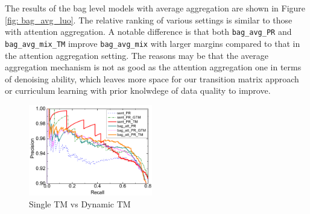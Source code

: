 The results of the bag level models with average aggregation are shown in Figure \ref{fig: bag_avg_luo}. The relative ranking of various settings is similar to those with attention aggregation.
A notable difference is that both \texttt{bag\_avg\_PR} and \texttt{bag\_avg\_mix\_TM} improve \texttt{bag\_avg\_mix} with larger margins compared to that in the attention aggregation setting. The reasons may be that the average aggregation mechanism is not as good as the attention aggregation one in terms of denoising ability, which leaves more space for our transition matrix approach or curriculum learning with prior knolwdege of data quality to improve.

\begin{figure}[t!]
\begin{center}
\includegraphics[width=0.48\textwidth]{figures/single_cmp_exp_overall.pdf}
\caption{Single TM vs Dynamic TM}
\label{fig: cmp_single_dynamic}
\end{center}
\end{figure}

